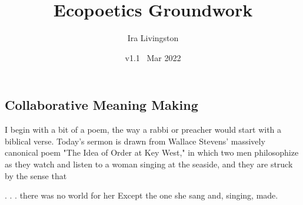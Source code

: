 \documentclass[draft]{article}
\title{Ecopoetics Groundwork}
\author{Ira Livingston}
\date{v1.1 \ Mar 2022}
\begin{document}
\maketitle
\subsection{Collaborative Meaning Making}

I begin with a bit of a poem, the way a rabbi or preacher would start with a biblical verse. Today's sermon is drawn from Wallace Stevens' massively canonical poem "The Idea of Order at Key West," in which two men philosophize as they watch and listen to a woman singing at the seaside, and they are struck by the sense that \par
. . . there was no world for her 
Except the one she sang and, singing, made.
\end{document}
